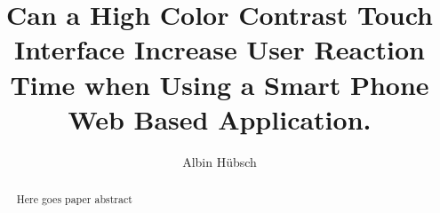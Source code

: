\documentclass[runningheads,a4paper]{llncs}
\begin{document}
\pagestyle{headings}

\mainmatter


\title{Can a High Color Contrast Touch Interface Increase User Reaction Time when Using a Smart Phone Web Based Application.}





\author{Albin Hübsch}


\maketitle

%
\begin{abstract}
Here goes paper abstract
\end{abstract}
%
\end{document}
